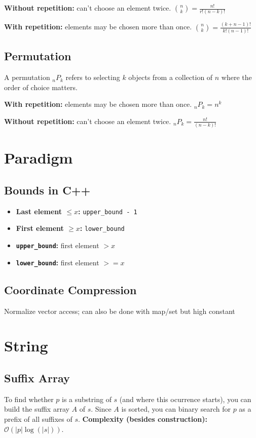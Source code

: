 \documentclass[a4paper]{article}
\begin{document}
\textbf{Without repetition:} can't choose an element twice. $\binom{n}{k} = \frac{n!}{r!(n-k)!}$

\textbf{With repetition:} elements may be chosen more than once. $\binom{n}{k} = \frac{(k+n-1)!}{k!(n-1)!}$

\subsection{Permutation}
A permutation ${}_nP_k$ refers to selecting $k$ objects from a collection of $n$ where the order of choice matters.

\textbf{With repetition:} elements may be chosen more than once. ${}_nP_k = n^k$

\textbf{Without repetition:} can't choose an element twice. ${}_nP_k = \frac{n!}{(n-k)!}$

\section{Paradigm}
\subsection{Bounds in C++}
\begin{itemize}
  \item \textbf{Last element $\leq x$:} \texttt{upper\_bound - 1}
  \item \textbf{First element $\geq x$:} \texttt{lower\_bound}
  \item \textbf{\texttt{upper\_bound}:} first element $> x$
  \item \textbf{\texttt{lower\_bound}:} first element $>= x$
\end{itemize}

\subsection{Coordinate Compression}
Normalize vector access; can also be done with map/set but high constant

\section{String}
\subsection{Suffix Array}
To find whether $p$ is a substring of $s$ (and where this ocurrence starts), you can build the suffix array $A$ of $s$. Since $A$ is sorted, you can binary search for $p$ as a prefix of all suffixes of $s$. \textbf{Complexity (besides construction):} $\mathcal{O}(\left|p\right|\log(\left|s\right|))$.
\end{document}

